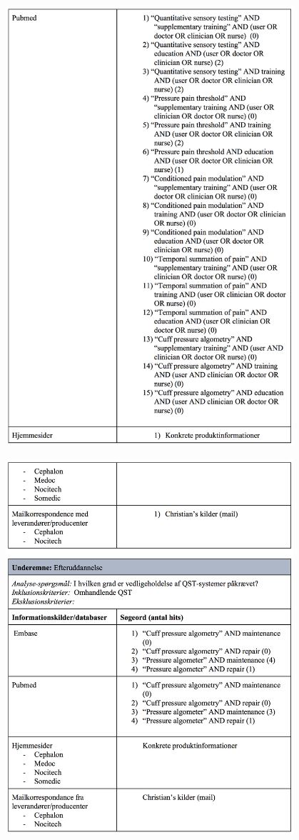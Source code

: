 \begin{center}
	\includegraphics[width=0.8\textwidth]{rapportAfsnit/qBilag/sogninger/ORG3}
	
	\includegraphics[width=0.8\textwidth]{rapportAfsnit/qBilag/sogninger/ORG4}
\end{center}

